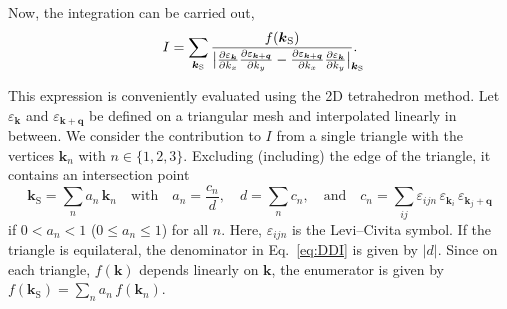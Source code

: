 \documentclass[a4paper]{article}
\def\sub#1{_{\text{#1}}}
\def\from#1{_{\mathrlap{#1}}}
\let\epsilon\varepsilon
\let\vec\boldsymbol
\begin{document}
%
Now, the integration can be carried out,
%
\begin{equation}
    \label{eq:DDI}
    I = \sum_{\vec k \sub S}
    \frac{f(\vec k \sub S)}
    {\big|
        \frac{\partial \epsilon_{\vec k}}{\partial k_x}
        \frac{\partial \epsilon_{\vec k + \vec q}}{\partial k_y}
        -
        \frac{\partial \epsilon_{\vec k + \vec q}}{\partial k_x}
        \frac{\partial \epsilon_{\vec k}}{\partial k_y}
    \big| \from{\vec k \sub S}}.
\end{equation}

This expression is conveniently evaluated using the 2D tetrahedron method. Let $\epsilon_{\vec k}$ and $\epsilon_{\vec k + \vec q}$ be defined on a triangular mesh and interpolated linearly in between. We consider the contribution to $I$ from a single triangle with the vertices $\vec k_n$ with $n \in \{ 1, 2, 3 \}$. Excluding (including) the edge of the triangle, it contains an intersection point
%
\begin{equation}
    \vec k \sub S = \sum_n a_n \, \vec k_n
    \quad \text{with} \quad
    a_n = \frac {c_n} d,
    \quad
    d = \sum_n c_n,
    \quad \text{and} \quad
    c_n = \sum_{i j} \epsilon_{i j n} \, \epsilon_{\vec k_i} \, \epsilon_{\vec k_j + \vec q}
\end{equation}
%
if $0 < a_n < 1$ ($0 \leq a_n \leq 1$) for all $n$. Here, $\epsilon_{i j n}$ is the Levi--Civita symbol. If the triangle is equilateral, the denominator in Eq.~\ref{eq:DDI} is given by $|d|$. Since on each triangle, $f(\vec k)$ depends linearly on $\vec k$, the enumerator is given by $f(\vec k \sub S) = \sum_n a_n \, f(\vec k_n)$.
\end{document}
